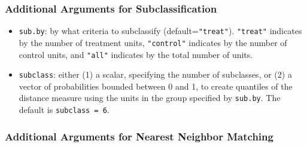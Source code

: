 \subsubsection{Additional Arguments for Subclassification}
\label{subsubsec:inputs-subclass}

\begin{itemize}
\item \texttt{sub.by}: by what criteria to subclassify
  (default=\texttt{"treat"}).  \texttt{"treat"} indicates by the
  number of treatment units, \texttt{"control"} indicates by the
  number of control units, and \texttt{"all"} indicates by the total
  number of units.
\item \texttt{subclass}: either (1) a scalar, specifying the number
  of subclasses, or (2) a vector of probabilities bounded between 0
  and 1, to create quantiles of the distance measure using the units
  in the group specified by \texttt{sub.by}.  The default is
  \texttt{subclass = 6}.
\end{itemize}

\subsubsection{Additional Arguments for Nearest Neighbor Matching}
\label{subsubsec:inputs-nearest}

